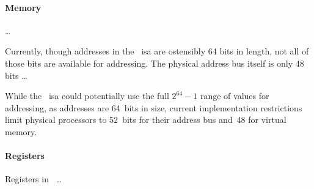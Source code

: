 \paragraph{Memory}
\todo\dots


Currently, though addresses in the \arch\ \ac{isa} are ostensibly 64 bits in length,
not all of those bits are available for addressing.
The physical address bus itself is only 48 bits
\todo\dots

While the \arch\ \ac{isa} could potentially use the full $2^{64}-1$
range of values for addressing, as addresses are 64~bits in size,
current implementation restrictions limit physical processors to
52~bits for their address bus and~48 for virtual memory.

\paragraph{Registers}
Registers in \arch\ \todo\dots
